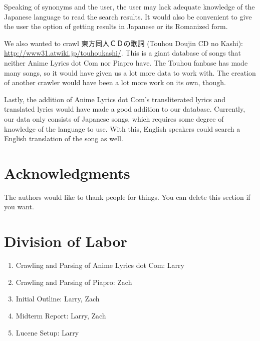 \documentclass{acm} %
\begin{document}
\begin{CJK}{UTF8}{zhsong}
Speaking of synonyms and the user, the user may lack adequate knowledge of the Japanese language to read the search results. It would also be convenient to give the user the option of getting results in Japanese or its Romanized form.

We also wanted to crawl 東方同人ＣＤの歌詞 (Touhou Doujin CD no Kashi): \url{http://www31.atwiki.jp/touhoukashi/}. This is a giant database of songs that neither Anime Lyrics dot Com nor Piapro have. The Touhou fanbase has made many songs, so it would have given us a lot more data to work with. The creation of another crawler would have been a lot more work on its own, though.

Lastly, the addition of Anime Lyrics dot Com's transliterated lyrics and translated lyrics would have made a good addition to our database. Currently, our data only consists of Japanese songs, which requires some degree of knowledge of the language to use. With this, English speakers could search a English translation of the song as well.

\section*{Acknowledgments}

The authors would like to thank people for things. You can delete this section
if you want.

\appendix

\section{Division of Labor}

\begin{enumerate}
\item Crawling and Parsing of Anime Lyrics dot Com: Larry
\item Crawling and Parsing of Piapro: Zach
\item Initial Outline: Larry, Zach
\item Midterm Report: Larry, Zach
\item Lucene Setup: Larry
\end{enumerate}



\end{CJK}
\end{document}
